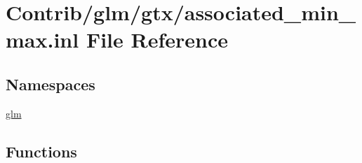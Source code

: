 \hypertarget{associated__min__max_8inl}{}\section{Contrib/glm/gtx/associated\+\_\+min\+\_\+max.inl File Reference}
\label{associated__min__max_8inl}
\subsection*{Namespaces}
\begin{DoxyCompactItemize}
\item 
 \mbox{\hyperlink{namespaceglm}{glm}}
\end{DoxyCompactItemize}
\subsection*{Functions}

